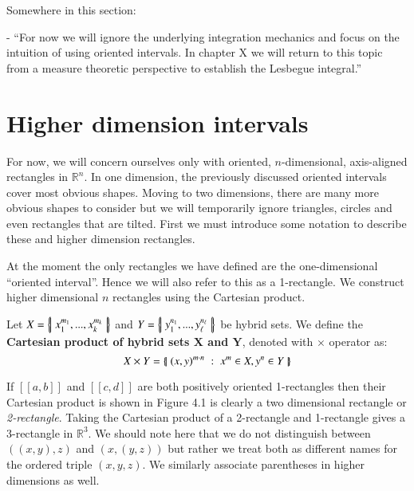 Somewhere in this section:

- ``For now we will ignore the underlying integration mechanics and focus on the intuition of using oriented intervals. In chapter X we will return to this topic from a measure theoretic perspective to establish the Lesbegue integral.''

\section{Higher dimension intervals}

For now, we will concern ourselves only with oriented, $n$-dimensional, axis-aligned rectangles in $\mathbb{R}^n$.
In one dimension, the previously discussed oriented intervals cover most obvious shapes.
Moving to two dimensions, there are many more obvious shapes to consider but we will temporarily ignore triangles, circles and even rectangles that are tilted.
First we must introduce some notation to describe these and higher dimension rectangles. 

At the moment the only rectangles we have defined are the one-dimensional ``oriented interval''.
Hence we will also refer to this as a 1-rectangle.
We construct higher dimensional $n$ rectangles using the Cartesian product.
\begin{definition}
	Let $X = \left\{ \! \left| \;  x_1^{m_1}, ... , x_k^{m_k}  \; \right| \! \right\}$ and $Y= \left\{ \! \left| \;  y_1^{n_1}, ... , y_\ell^{n_\ell}  \; \right| \! \right\}$ be hybrid sets.
	We define the \textbf{Cartesian product of hybrid sets $\boldsymbol{X}$ and $\boldsymbol{Y}$}, denoted with $\times$ operator as:
	\begin{equation}
		X \times Y = \left\{ \! \left| \;  (x, y)^{m \cdot n} \; : \; x^m \in X, y^n \in Y  \; \right| \! \right\}
	 \end{equation}
\end{definition}

If $[\![a,b]\!]$ and $[\![c,d]\!]$ are both positively oriented 1-rectangles then their Cartesian product is shown in Figure 4.1 is clearly a two dimensional rectangle or \emph{2-rectangle}. 
Taking the Cartesian product of a 2-rectangle and 1-rectangle gives a 3-rectangle in $\mathbb{R}^3$. 
We should note here that we do not distinguish between $((x,y),z)$ and $(x,(y,z))$ but rather we treat both as different names for the ordered triple $(x,y,z)$.
We similarly associate parentheses in higher dimensions as well.

